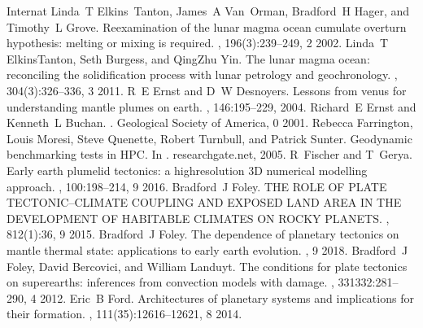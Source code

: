 \documentclass[letterpaper,10pt,english]{jupyterBook}
\begin{document}
\begin{sphinxthebibliography}{Internat}
\sphinxAtStartPar
Linda T Elkins Tanton, James A Van Orman, Bradford H Hager, and Timothy L Grove. Re\sphinxhyphen{}examination of the lunar magma ocean cumulate overturn hypothesis: melting or mixing is required. , 196(3):239–249, 2 2002.
\sphinxAtStartPar
Linda T Elkins\sphinxhyphen{}Tanton, Seth Burgess, and Qing\sphinxhyphen{}Zhu Yin. The lunar magma ocean: reconciling the solidification process with lunar petrology and geochronology. , 304(3):326–336, 3 2011.
\sphinxAtStartPar
R E Ernst and D W Desnoyers. Lessons from venus for understanding mantle plumes on earth. , 146:195–229, 2004.
\sphinxAtStartPar
Richard E Ernst and Kenneth L Buchan. . Geological Society of America, 0 2001.
\sphinxAtStartPar
Rebecca Farrington, Louis Moresi, Steve Quenette, Robert Turnbull, and Patrick Sunter. Geodynamic benchmarking tests in HPC. In . researchgate.net, 2005.
\sphinxAtStartPar
R Fischer and T Gerya. Early earth plume\sphinxhyphen{}lid tectonics: a high\sphinxhyphen{}resolution 3D numerical modelling approach. , 100:198–214, 9 2016.
\sphinxAtStartPar
Bradford J Foley. THE ROLE OF PLATE TECTONIC–CLIMATE COUPLING AND EXPOSED LAND AREA IN THE DEVELOPMENT OF HABITABLE CLIMATES ON ROCKY PLANETS. , 812(1):36, 9 2015.
\sphinxAtStartPar
Bradford J Foley. The dependence of planetary tectonics on mantle thermal state: applications to early earth evolution. , 9 2018.
\sphinxAtStartPar
Bradford J Foley, David Bercovici, and William Landuyt. The conditions for plate tectonics on super\sphinxhyphen{}earths: inferences from convection models with damage. , 331\sphinxhyphen{}332:281–290, 4 2012.
\sphinxAtStartPar
Eric B Ford. Architectures of planetary systems and implications for their formation. , 111(35):12616–12621, 8 2014.
\sphinxAtStartPar

\end{sphinxthebibliography}
\end{document}
